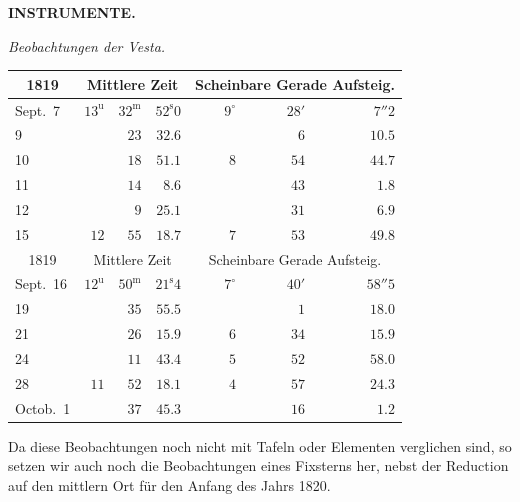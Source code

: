 \clearpage
\thispagestyle{empty}
\noindent{}%
%
\parbox[t]{\dimexpr\linewidth-24mm\relax}{\centering\footnotesize\bfseries INSTRUMENTE.\par}%
\makebox[12mm][r]{}\par\nobreak\medskip
{}
\emph{Beobachtungen der Vesta.}

\begin{center}
\begin{tabular}{l|rrr|rrr}
\multicolumn{1}{c|}{1819}  &  \multicolumn{3}{c|}{Mittlere Zeit}  &  \multicolumn{3}{c}{Scheinbare Gerade Aufsteig.}  \\
\hline
Sept.\ 7  &  $13^{\mathrm u}$  &  $32^{\mathrm m}$  &  $52^{\mathrm s}0$  &  $9^\circ$  &  $28'$  &  $7''2$  \\
9  &   &  $23$  &  $32.6$  &   &  $6$  &  $10.5$  \\
10  &   &  $18$  &  $51.1$  &  $8$  &  $54$  &  $44.7$  \\
11  &   &  $14$  &  $8.6$  &   &  $43$  &  $1.8$  \\
12  &   &  $9$  &  $25.1$  &   &  $31$  &  $6.9$  \\
15  &  $12$  &  $55$  &  $18.7$  &  $7$  &  $53$  &  $49.8$  \\
\hline
 \multicolumn{1}{c|}{1819}  &  \multicolumn{3}{c|}{Mittlere Zeit}  &  \multicolumn{3}{c}{Scheinbare Gerade Aufsteig.}  \\
\hline
 Sept.\ 16  &  $12^{\mathrm u}$  &  $50^{\mathrm m}$  &  $21^{\mathrm s}4$  &  $7^\circ$  &  $40'$  &  $58''5$  \\
 19  &   &  $35$  &  $55.5$  &   &  $1$  &  $18.0$  \\
 21  &   &  $26$  &  $15.9$  &  $6$  &  $34$  &  $15.9$  \\
 24  &   &  $11$  &  $43.4$  &  $5$  &  $52$  &  $58.0$  \\
 28  &  $11$  &  $52$  &  $18.1$  &  $4$  &  $57$  &  $24.3$  \\
 Octob.\ 1  &   &  $37$  &  $45.3$  &   &  $16$  &  $1.2$  \\
\end{tabular}
\end{center}

\par\indent Da diese Beobachtungen noch nicht mit Tafeln oder Elementen verglichen sind, so setzen wir auch noch die Beobachtungen eines Fixsterns her, nebst der Reduction auf den mittlern Ort für den Anfang des Jahrs 1820.


